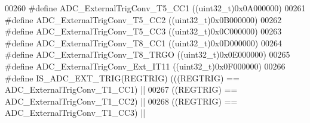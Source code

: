 \begin{DoxyCode}
00260 \textcolor{preprocessor}{#}\textcolor{preprocessor}{define} \textcolor{preprocessor}{ADC\_ExternalTrigConv\_T5\_CC1}                \textcolor{preprocessor}{(}\textcolor{preprocessor}{(}\textcolor{preprocessor}{uint32\_t}\textcolor{preprocessor}{)}0x0A000000\textcolor{preprocessor}{)}
00261 \textcolor{preprocessor}{#}\textcolor{preprocessor}{define} \textcolor{preprocessor}{ADC\_ExternalTrigConv\_T5\_CC2}                \textcolor{preprocessor}{(}\textcolor{preprocessor}{(}\textcolor{preprocessor}{uint32\_t}\textcolor{preprocessor}{)}0x0B000000\textcolor{preprocessor}{)}
00262 \textcolor{preprocessor}{#}\textcolor{preprocessor}{define} \textcolor{preprocessor}{ADC\_ExternalTrigConv\_T5\_CC3}                \textcolor{preprocessor}{(}\textcolor{preprocessor}{(}\textcolor{preprocessor}{uint32\_t}\textcolor{preprocessor}{)}0x0C000000\textcolor{preprocessor}{)}
00263 \textcolor{preprocessor}{#}\textcolor{preprocessor}{define} \textcolor{preprocessor}{ADC\_ExternalTrigConv\_T8\_CC1}                \textcolor{preprocessor}{(}\textcolor{preprocessor}{(}\textcolor{preprocessor}{uint32\_t}\textcolor{preprocessor}{)}0x0D000000\textcolor{preprocessor}{)}
00264 \textcolor{preprocessor}{#}\textcolor{preprocessor}{define} \textcolor{preprocessor}{ADC\_ExternalTrigConv\_T8\_TRGO}               \textcolor{preprocessor}{(}\textcolor{preprocessor}{(}\textcolor{preprocessor}{uint32\_t}\textcolor{preprocessor}{)}0x0E000000\textcolor{preprocessor}{)}
00265 \textcolor{preprocessor}{#}\textcolor{preprocessor}{define} \textcolor{preprocessor}{ADC\_ExternalTrigConv\_Ext\_IT11}              \textcolor{preprocessor}{(}\textcolor{preprocessor}{(}\textcolor{preprocessor}{uint32\_t}\textcolor{preprocessor}{)}0x0F000000\textcolor{preprocessor}{)}
00266 \textcolor{preprocessor}{#}\textcolor{preprocessor}{define} \textcolor{preprocessor}{IS\_ADC\_EXT\_TRIG}\textcolor{preprocessor}{(}\textcolor{preprocessor}{REGTRIG}\textcolor{preprocessor}{)} \textcolor{preprocessor}{(}\textcolor{preprocessor}{(}\textcolor{preprocessor}{(}\textcolor{preprocessor}{REGTRIG}\textcolor{preprocessor}{)} \textcolor{preprocessor}{==} ADC_ExternalTrigConv_T1_CC1\textcolor{preprocessor}{)} \textcolor{preprocessor}{||}
00267                                   \textcolor{preprocessor}{(}\textcolor{preprocessor}{(}\textcolor{preprocessor}{REGTRIG}\textcolor{preprocessor}{)} \textcolor{preprocessor}{==} ADC_ExternalTrigConv_T1_CC2\textcolor{preprocessor}{)} \textcolor{preprocessor}{||}
00268                                   \textcolor{preprocessor}{(}\textcolor{preprocessor}{(}\textcolor{preprocessor}{REGTRIG}\textcolor{preprocessor}{)} \textcolor{preprocessor}{==} ADC_ExternalTrigConv_T1_CC3\textcolor{preprocessor}{)} \textcolor{preprocessor}{||}

\end{DoxyCode}
